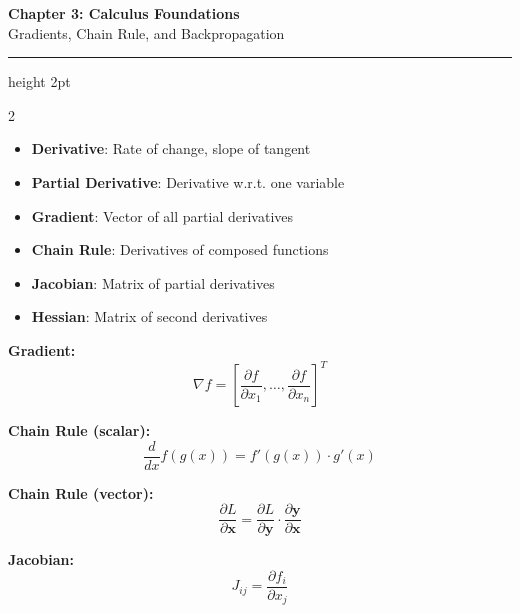 \documentclass[11pt,letterpaper]{article}
\begin{document}
\begin{center}
{\LARGE\bfseries\color{primaryblue} Chapter 3: Calculus Foundations}\\[3pt]
{\large Gradients, Chain Rule, and Backpropagation}
\end{center}
\vspace{-5pt}
\hrule height 2pt
\vspace{8pt}

\begin{multicols}{2}

\begin{tcolorbox}[conceptbox, title={\faLightbulb\ Key Concepts}]
\begin{itemize}
    \item \textbf{Derivative}: Rate of change, slope of tangent
    \item \textbf{Partial Derivative}: Derivative w.r.t. one variable
    \item \textbf{Gradient}: Vector of all partial derivatives
    \item \textbf{Chain Rule}: Derivatives of composed functions
    \item \textbf{Jacobian}: Matrix of partial derivatives
    \item \textbf{Hessian}: Matrix of second derivatives
\end{itemize}
\end{tcolorbox}

\begin{tcolorbox}[formulabox, title={\faCalculator\ Core Formulas}]
\textbf{Gradient:}
\[ \nabla f = \left[ \frac{\partial f}{\partial x_1}, \ldots, \frac{\partial f}{\partial x_n} \right]^T \]

\textbf{Chain Rule (scalar):}
\[ \frac{d}{dx} f(g(x)) = f'(g(x)) \cdot g'(x) \]

\textbf{Chain Rule (vector):}
\[ \frac{\partial L}{\partial \mathbf{x}} = \frac{\partial L}{\partial \mathbf{y}} \cdot \frac{\partial \mathbf{y}}{\partial \mathbf{x}} \]

\textbf{Jacobian:}
\[ J_{ij} = \frac{\partial f_i}{\partial x_j} \]
\end{tcolorbox}

\columnbreak

\begin{center}
\end{center}
\end{multicols}
\end{document}
